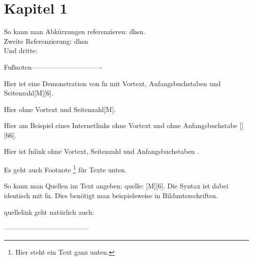 \section{Kapitel 1}
So kann man Abkürzungen referenzieren: \ac{dhsn}.\\
Zweite Referenzierung: \ac{dhsn} \\
Und dritte: \dhsn %


Fußnoten-------------------------------

Hier ist eine Demonstration von fn mit Vortext, Anfangsbuchstaben und Seitenzahl[M][6].

Hier ohne Vortext und Seitenzahl[M].

Hier am Beispiel eines Internetlinks ohne Vortext und ohne Anfangsbuchstabe [][66]. %

Hier ist fnlink ohne Vortext, Seitenzahl und Anfangsbuchstaben .

Es geht auch Footnote \footnote{Hier steht ein Text ganz unten.} für Texte unten.

So kann man Quellen im Text angeben: quelle: [M][6]. Die Syntax ist dabei identisch mit fn. Dies benötigt man beispielsweise in Bildunterschriften.

quellelink geht natürlich auch: 

--------------------------------------



